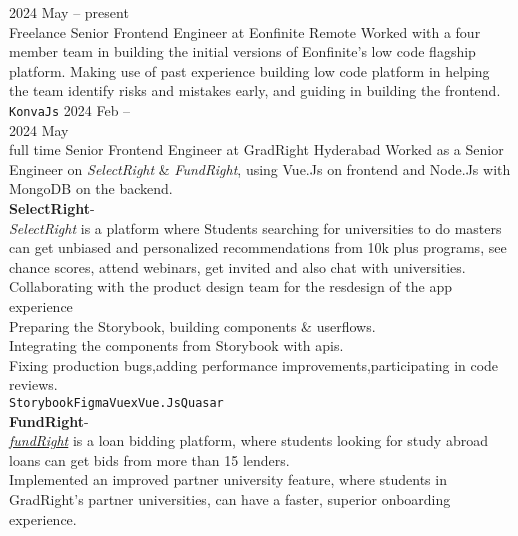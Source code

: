 \documentclass[9pt]{developercv} %
\begin{document}
\begin{entrylist}
	\entry
		{2024 May -- present \\\footnotesize{Freelance}}
		{Senior Frontend Engineer}
		{at}
		{Eonfinite}
		{Remote}
		{
			Worked with a four member team in building the initial versions of Eonfinite's low code flagship platform.
			Making use of past experience building low code platform in helping the team identify risks and mistakes early, and guiding in building the frontend.\\
			\texttt{KonvaJs}
		}
		\entry
		{2024 Feb -- \\ 2024 May \\\footnotesize{full time}}
		{Senior Frontend Engineer}
		{at}
		{GradRight}
		{Hyderabad}
		{
			Worked as a Senior Engineer on {\emph{SelectRight}\texttrademark} \& {\emph{FundRight}\texttrademark}, using Vue.Js on frontend and Node.Js with MongoDB on the backend.\smallskip\\
			\textbf{SelectRight}\;-\;{\footnotesize\textcolor{darkgray}{The hassle-free platform to find the 'right program' for your Master's abroad.}}\\
			{\emph{SelectRight}\texttrademark} is a platform where Students searching for universities to do masters can get unbiased and personalized recommendations from 10k plus programs, see chance scores, attend webinars, get invited and also chat with universities.\smallskip\\
			\faCaretRight\: Collaborating with the product design team for the resdesign of the app experience\\
			\faCaretRight\: Preparing the Storybook, building components \& userflows.\\
			\faCaretRight\: Integrating the components from Storybook with apis.\\
			\faCaretRight\: Fixing production bugs,adding performance improvements,participating in code reviews.\\
			\texttt{Storybook}\slashsep\texttt{Figma}\slashsep\texttt{Vuex}\slashsep\texttt{Vue.Js}\slashsep\texttt{Quasar}\smallskip\\
			\textbf{FundRight}\;-\;{\footnotesize\textcolor{darkgray}{The hassle-free platform to find the 'best loan' for your Master's abroad.}}\\
			\href{https://fund.gradright.com}{\emph{fundRight}\texttrademark} is a loan bidding platform, where students looking for study abroad loans can get bids from more than 15 lenders.\smallskip\\
			\faCaretRight\: Implemented an improved partner university feature, where students in GradRight's partner universities, can have a faster, superior onboarding experience.\\
}
\end{entrylist}
\end{document}
